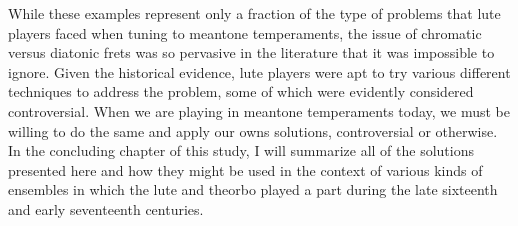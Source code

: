 While these examples represent only a fraction of the type of problems that lute
players faced when tuning to meantone temperaments, the issue of chromatic versus
diatonic frets was so pervasive in the literature that it was impossible to ignore.
Given the historical evidence, lute players were apt to try various different
techniques to address the problem, some of which were evidently considered
controversial. When we are playing in meantone temperaments today, we must be willing
to do the same and apply our owns solutions, controversial or otherwise.  In the
concluding chapter of this study, I will summarize all of the solutions presented here
and how they might be used in the context of various kinds of ensembles in which the
lute and theorbo played a part during the late sixteenth and early seventeenth
centuries.